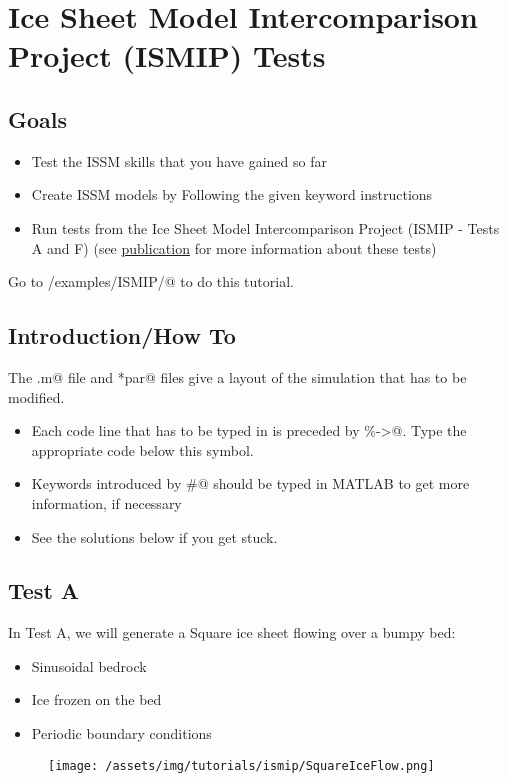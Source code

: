 \section{Ice Sheet Model Intercomparison Project (ISMIP) Tests}
\subsection{Goals} %
\begin{itemize}
	\item Test the ISSM skills that you have gained so far
	\item Create ISSM models by Following the given keyword instructions
	\item Run tests from the Ice Sheet Model Intercomparison Project (ISMIP - Tests A and F) (see \href{https://tc.copernicus.org/articles/2/95/2008/}{publication} for more information about these tests)
\end{itemize}

Go to \verb@trunk/examples/ISMIP/@ to do this tutorial.

\subsection{Introduction/How To} %
The \verb@runme.m@ file and \verb@*par@ files give a layout of the simulation that has to be modified.
\begin{itemize}
	\item Each code line that has to be typed in is preceded by \verb@\%->@. Type the appropriate code below this symbol.
	\item Keywords introduced by \verb@#@ should be typed in MATLAB to get more information, if necessary
	\item See the solutions below if you get stuck.
\end{itemize}
\subsection{Test A} %
In Test A, we will generate a Square ice sheet flowing over a bumpy bed:
\begin{itemize}
	\item Sinusoidal bedrock
	\item Ice frozen on the bed
	\item Periodic boundary conditions
\end{itemize}
\begin{figure}[H]
	\begin{center}
		\texttt{[image: /assets/img/tutorials/ismip/SquareIceFlow.png]}
	\end{center}
\end{figure}

